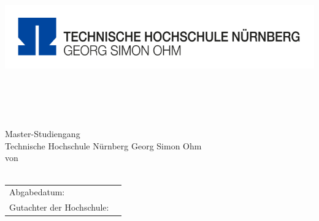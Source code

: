 \thispagestyle{plain}
\begin{titlepage}
\enlargethispage{3.5cm}
\sffamily 								%
\begin{minipage}{\textwidth}
	\vspace{-2cm}
	\noindent \includegraphics[scale=0.2]{Images/Logo_TH.png} \hfill
\end{minipage} 
\begin{center}

\huge{\textsc{\textbf{\titel}}}\\[1.5ex]
\Large{\textbf{\untertitel}}\\[5ex]
\LARGE{\textbf{\ausarbeitung}}\\[2ex]
\normalsize{~}\\[3ex]
\Large{Master-Studiengang \textit{\studiengang}}\\[1ex]
\normalsize{Technische Hochschule Nürnberg Georg Simon Ohm}\\[5ex]
von\\[1ex] \autor \\[12ex]

\begin{tabular}{ll}
	Abgabedatum:					& \quad \abgabeTH \\ 
	
	Gutachter der Hochschule: & \quad \betreuerth \\ 
	
\end{tabular} 

\end{center}

\end{titlepage}
\onehalfspacing